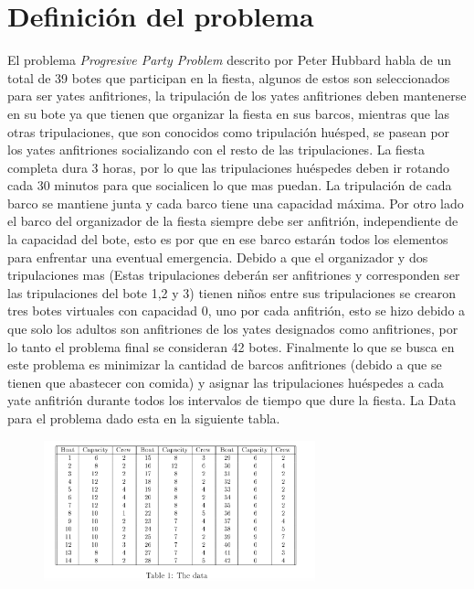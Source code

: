 \documentclass[spanish, fleqn]{article}
\begin{document}
\section{Definición del problema}

El problema \textit{Progresive Party Problem} descrito por Peter Hubbard habla de un total de 39 botes que participan en la fiesta, algunos de estos son seleccionados para ser yates anfitriones, la tripulación de los yates anfitriones deben mantenerse en su bote ya que tienen que organizar la fiesta en sus barcos, mientras que las otras tripulaciones, que son conocidos como tripulación huésped, se pasean por los yates anfitriones socializando con el resto de las tripulaciones. La fiesta completa dura 3 horas, por lo que las tripulaciones huéspedes deben ir rotando cada 30 minutos para que socialicen lo que mas puedan. La tripulación de cada barco se mantiene junta y cada barco tiene una capacidad máxima. Por otro lado el barco del organizador de la fiesta siempre debe ser anfitrión, independiente de la capacidad del bote, esto es por que en ese barco estarán todos los elementos para enfrentar una eventual emergencia. Debido a que el organizador y dos tripulaciones mas (Estas tripulaciones deberán ser anfitriones y corresponden ser las tripulaciones del bote 1,2 y 3) tienen niños entre sus tripulaciones  se crearon tres botes virtuales con capacidad 0, uno por cada anfitrión, esto se hizo debido a que solo los adultos son anfitriones de los yates designados como anfitriones, por lo tanto el problema final se consideran 42 botes. Finalmente lo que se busca en este problema es minimizar la cantidad de barcos anfitriones (debido a que se tienen que abastecer con comida) y asignar las tripulaciones huéspedes a cada yate anfitrión durante todos los intervalos de tiempo que dure la fiesta. La Data para el problema dado esta en la siguiente tabla.


\begin{figure}[!h]
  \centering
    \includegraphics[width=0.7\textwidth]{1}
  \label{fig:DiagramaBarra2}
\end{figure}
\end{document}
